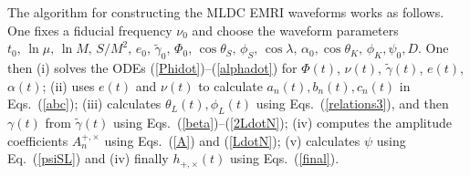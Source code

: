 \documentclass[12pt]{iopart}
\begin{document}
The algorithm for constructing the MLDC EMRI waveforms works as follows. One fixes a fiducial frequency $\nu_0$ and choose the waveform parameters $t_0,\,\ln\mu,\,\ln M,\,S/M^2,\,e_0,\,\tilde\gamma_0,\,\Phi_0,\,\cos\theta_S,\,\phi_S,\,\cos\lambda,\,\alpha_0,\cos\theta_K,\,\phi_K,\psi_0,D$. One then (i) solves the ODEs (\ref{Phidot})--(\ref{alphadot}) for $\Phi(t)$, $\nu(t)$, $\tilde\gamma(t)$, $e(t)$, $\alpha(t)$; (ii) uses $e(t)$ and $\nu(t)$ to calculate $a_n(t), b_n(t), c_n(t)$ in Eqs.~(\ref{abc}); (iii) calculates $\theta_L(t),\phi_L(t)$ using Eqs.~(\ref{relations3}), and then $\gamma(t)$ from $\tilde\gamma(t)$ using Eqs.~(\ref{beta})--(\ref{2LdotN}); (iv) computes the amplitude coefficients $A_n^{+,\times}$  using Eqs.~(\ref{A}) and (\ref{LdotN}); (v) calculates $\psi$ using Eq.~(\ref{psiSL}) and (iv) finally $h_{+,\times}(t)$ using
Eqs.~(\ref{final}).   
\end{document}
